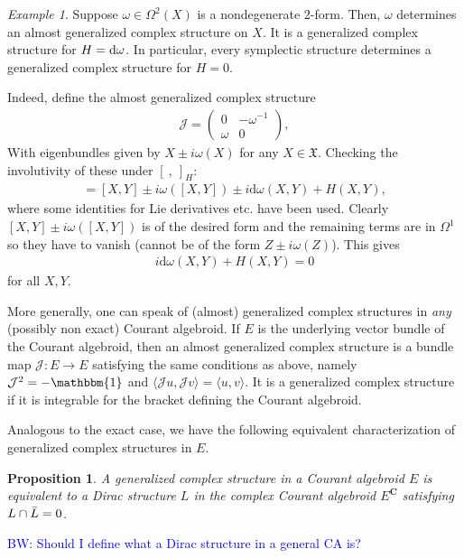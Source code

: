 \documentclass{article}
\newcommand{\JJ}{\mathcal{J}}
\newcommand{\Cc}{\mathbf{C}}
\newcommand{\XX}{\mathfrak{X}}
\newcommand{\id}{\mathbbm{1}}
\newcommand{\rd}{\mathrm{d}}
\newcommand{\brac}{[\ ,\ ]}
\def\d{{\rm d}}
\def\brian{\textcolor{blue}{BW: }\textcolor{blue}}
\newtheorem{proposition}[theorem]{Proposition}
\theoremstyle{definition}
\theoremstyle{definition}
\theoremstyle{remark}
\newtheorem{Ex}[theorem]{Example}
\begin{document}
\begin{Ex}
Suppose $\omega \in \Omega^2(X)$ is a nondegenerate $2$-form.
Then, $\omega$ determines an almost generalized complex structure on $X$.
It is a generalized complex structure for $H = \d \omega$.
In particular, every symplectic structure determines a generalized complex structure for $H = 0$.

Indeed, define the almost generalized complex structure
\begin{align*}
\JJ=
\begin{pmatrix}
0 & -\omega^{-1} \\
\omega & 0
\end{pmatrix},
\end{align*}
With eigenbundles given by $X\pm i\omega(X)$ for any $X\in \XX$. Checking the involutivity of these under $\brac_H$:
\begin{align*}
[X\pm i\omega(X),Y\pm i\omega(Y)]=[X,Y]\pm i \omega([X,Y])\pm i\rd \omega (X,Y)+H(X,Y),
\end{align*}
where some identities for Lie derivatives etc. have been used. Clearly $[X,Y]\pm i \omega([X,Y])$ is of the desired form and the remaining terms are in $\Omega^1$ so they have to vanish (cannot be of the form $Z\pm i \omega(Z)$). This gives
\begin{align*}
i\rd \omega (X,Y)+H(X,Y)=0 
\end{align*}
for all $X,Y$. 
\end{Ex}

More generally, one can speak of (almost) generalized complex structures in {\em any} (possibly non exact) Courant algebroid. 
If $E$ is the underlying vector bundle of the Courant algebroid, then an almost generalized complex structure is a bundle map $\JJ : E \to E$ satisfying the same conditions as above, namely $\JJ^2 = - \id$ and $\langle\JJ u, \JJ v\rangle = \langle u,v\rangle$.
It is a generalized complex structure if it is integrable for the bracket defining the Courant algebroid. 

Analogous to the exact case, we have the following equivalent characterization of generalized complex structures in $E$. 

\begin{proposition}
A generalized complex structure in a Courant algebroid $E$ is equivalent to a Dirac structure $L$ in the complex Courant algebroid $E^{\Cc}$ satisfying $L \cap \Bar{L} = 0$. 
\end{proposition}

\brian{Should I define what a Dirac structure in a general CA is?}
\end{document}
